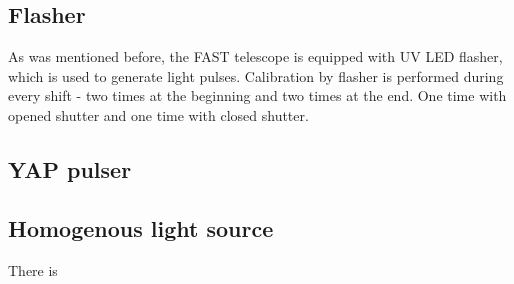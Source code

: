 \subsection{Flasher}
As was mentioned before, the FAST telescope is equipped with UV LED flasher, which is used to generate light pulses. Calibration by flasher is performed during every shift - two times at the beginning and two times at the end. One time with opened shutter and one time with closed shutter. 
\subsection{YAP pulser}



\subsection{Homogenous light source}
There is 






